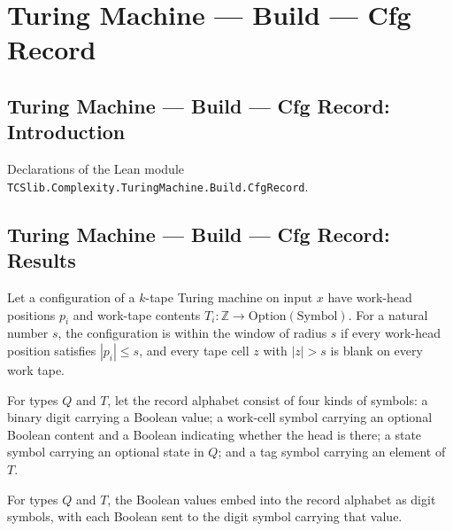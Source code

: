 \section{Turing Machine --- Build --- Cfg Record}
\subsection*{Turing Machine --- Build --- Cfg Record: Introduction}

Declarations of the Lean module \texttt{TCSlib.Complexity.TuringMachine.Build.CfgRecord}.

\subsection*{Turing Machine --- Build --- Cfg Record: Results}

\begin{definition}
\label{Turing.Cfg.InWindow}
\leanok
{}
Let a configuration of a $k$-tape Turing machine on input $x$ have work-head positions
$p_i$ and work-tape contents $T_i : \mathbb{Z}\to\mathrm{Option}(\mathrm{Symbol})$. For
a natural number $s$, the configuration is within the window of radius $s$ if every
work-head position satisfies $|p_i|\le s$, and every tape cell $z$ with $|z|>s$ is blank
on every work tape.
\end{definition}

\begin{definition}
\label{Turing.RecSym}
\leanok
For types $Q$ and $T$, let the record alphabet consist of four kinds of symbols: a
binary digit carrying a Boolean value; a work-cell symbol carrying an optional Boolean
content and a Boolean indicating whether the head is there; a state symbol carrying an
optional state in $Q$; and a tag symbol carrying an element of $T$.
\end{definition}

\begin{definition}
\label{Turing.RecSym.digitEmb}
\leanok
{}
For types $Q$ and $T$, the Boolean values embed into the record alphabet as digit
symbols, with each Boolean sent to the digit symbol carrying that value.
\end{definition}

